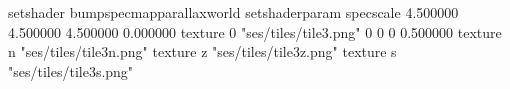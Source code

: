 setshader bumpspecmapparallaxworld
setshaderparam specscale 4.500000 4.500000 4.500000 0.000000
texture 0 "ses/tiles/tile3.png" 0 0 0 0.500000
texture n "ses/tiles/tile3n.png"
texture z "ses/tiles/tile3z.png"
texture s "ses/tiles/tile3s.png"


